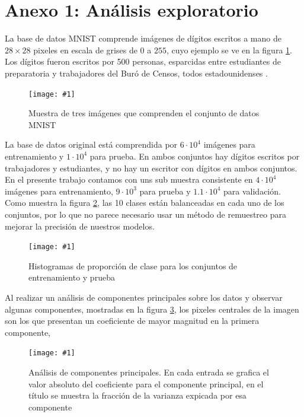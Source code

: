 \documentclass[11pt]{article}
\newcommand{\figura}[3]{\begin{figure}[H] \centering \texttt{[image: \#1]} \caption{#2} \label{#1}  \end{figure}}
\begin{document}
\section*{Anexo 1: Análisis exploratorio}
La base de datos MNIST comprende imágenes de dígitos escritos a mano de $28 \times 28$ pixeles en escala de grises de $0$ a $255$, cuyo ejemplo se ve en la figura \ref{digits.pdf}. Los dígitos fueron escritos por 500 personas, esparcidas entre estudiantes de preparatoria y trabajadores del Buró de Censos, todos estadounidenses \cite{lecunn}. 
\figura{digits.pdf}{Muestra de tres imágenes que comprenden el conjunto de datos MNIST}{width = 0.65\textwidth}
La base de datos original está comprendida por $6 \cdot 10^4$ imágenes para entrenamiento y $1 \cdot 10^4$ para prueba. En ambos conjuntos hay dígitos escritos por trabajadores y estudiantes, y no hay un escritor con dígitos en ambos conjuntos. En el presente trabajo contamos con uns sub muestra consistente en $4 \cdot 10^4 $ imágenes para entrenamiento, $9 \cdot 10^3$  para prueba y $1.1 \cdot 10^4$ para validación. Como muestra la figura \ref{hist.pdf}, las 10 clases están balanceadas en cada uno de los conjuntos, por lo que no parece necesario usar un método de remuestreo para mejorar la precisión de nuestros modelos.
\figura{hist.pdf}{Histogramas de proporción de clase para los conjuntos de entrenamiento y prueba}{width = 0.65\textwidth}
Al realizar un análisis de componentes principales sobre los datos y observar algunas componentes, mostradas en la figura \ref{pca.pdf}, los pixeles centrales de la imagen son los que presentan un coeficiente de mayor magnitud en la primera componente, 
\figura{pca.pdf}{Análisis de componentes principales. En cada entrada se grafica el valor absoluto del coeficiente para el componente principal, en el título se muestra la fracción de la varianza expicada por esa componente}{width = 0.9\textwidth}
\end{document}
